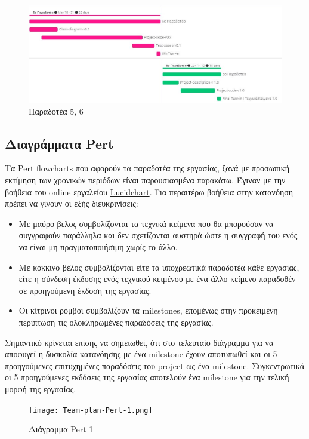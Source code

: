 \documentclass{article}
\begin{document}
\begin{figure}[!htb]
\centering
\includegraphics[width=1.0\textwidth]{Team-plan-Gannt-3.jpg}
\caption{\label{fig:log in page} Παραδοτέα 5, 6}
\end{figure}



\subsection{Διαγράμματα Pert}
Τα Pert flowcharts που αφορούν τα παραδοτέα της εργασίας, ξανά με προσωπική εκτίμηση των χρονικών περιόδων είναι παρουσιασμένα παρακάτω. Έγιναν με την βοήθεια του online εργαλείου \href{https://lucid.app}{Lucidchart}. Για περαιτέρω βοήθεια στην κατανόηση πρέπει να γίνουν οι εξής διευκρινίσεις:

\begin{itemize}
  \item Με μαύρο βελος συμβολίζονται τα τεχνικά κείμενα που θα μπορούσαν να συγγραφούν παράλληλα και δεν σχετίζονται αυστηρά ώστε η συγγραφή του ενός να είναι μη πραγματοποιήσιμη χωρίς το άλλο.
  \item Με κόκκινο βέλος συμβολίζονται είτε τα υποχρεωτικά παραδοτέα κάθε εργασίας, είτε η σύνδεση έκδοσης ενός τεχνικού κειμένου με ένα άλλο κείμενο παραδοθέν σε προηγούμενη έκδοση της εργασίας.
  \item Οι κίτρινοι ρόμβοι συμβολίζουν τα milestones, επομένως στην προκειμένη περίπτωση τις ολοκληρωμένες παραδόσεις της εργασίας.
\end{itemize}

Σημαντικό κρίνεται επίσης να σημειωθεί, ότι στο τελευταίο διάγραμμα για να αποφυγεί η δυσκολία κατανόησης με ένα milestone έχουν αποτυπωθεί και οι 5 προηγούμενες επιτυχημένες παραδόσεις του project ως ένα milestone. Συγκεντρωτικά οι 5 προηγούμενες εκδόσεις της εργασίας αποτελούν ένα milestone για την τελική μορφή της εργασίας.

\newpage

\begin{figure}[!htb]
\centering
\texttt{[image: Team-plan-Pert-1.png]}
\caption{\label{fig:log in page}Διάγραμμα Pert  1}
\end{figure}
 
\end{document}
